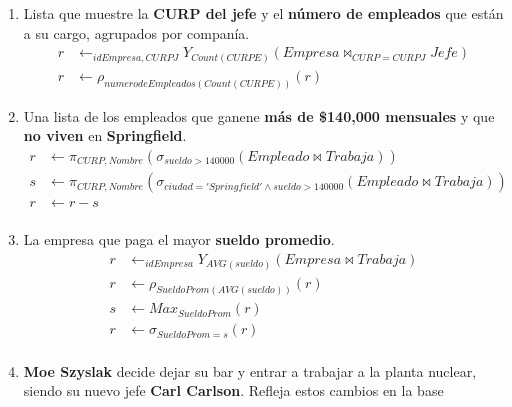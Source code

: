 \documentclass{article}
\begin{document}
\begin{enumerate}
{{\begin{enumerate}
                    \item {
                        Lista que muestre la \textbf{CURP del jefe} y el
                        \textbf{número de empleados} que están a su cargo,
                        agrupados por companía.
                         \begin{align*}                         
                         r & \leftarrow _{idEmpresa,CURPJ}Y_{Count(CURPE)}(Empresa\bowtie_{CURP = CURPJ} Jefe )\\
                         r & \leftarrow \rho_{numerodeEmpleados(Count(CURPE))}(r)
                         \end{align*}
                    }
                    \item {
                        Una lista de los empleados que ganene \textbf{más de 
                        \$140,000 mensuales} y que \textbf{no viven} en
                        \textbf{Springfield}.
                        \begin{align*}
                        	r & \leftarrow \pi_{CURP,Nombre} (\sigma_{sueldo >140000}(Empleado \bowtie Trabaja))\\
                        	s & \leftarrow \pi_{CURP,Nombre} (\sigma_{ciudad= 'Springfield'\wedge sueldo >140000 }(Empleado \bowtie Trabaja))\\
                        	r & \leftarrow r-s\\                        	
                        \end{align*}
                    }
                    \item {
                        La empresa que paga el mayor \textbf{sueldo promedio}.
                        \begin{align*}
                        	r & \leftarrow _{idEmpresa}Y_{AVG(sueldo)}(Empresa \bowtie Trabaja)\\
                        	r & \leftarrow \rho_{SueldoProm(AVG(sueldo))}(r)\\
                        	s & \leftarrow Max_{SueldoProm}(r)\\
                        	r & \leftarrow \sigma_{SueldoProm = s}(r)\\
                        \end{align*}
                    }
                    \item {
                        \textbf{Moe Szyslak} decide dejar su bar y entrar a
                        trabajar a la planta nuclear, siendo su nuevo jefe
                        \textbf{Carl Carlson}. Refleja estos cambios en la base
}
\end{enumerate}}}
\end{enumerate}
\end{document}
